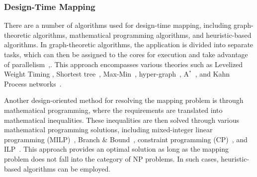 \subsubsection{Design-Time Mapping} There are a number of algorithms used for design-time mapping, including graph-theoretic algorithms, mathematical programming algorithms, and heuristic-based algorithms. In graph-theoretic algorithms, the application is divided into separate tasks, which can then be assigned to the cores for execution and take advantage of parallelism~\cite{gupta2021mapping},\cite{deveci2015hypergraph}. This approach encompasses various theories such as Levelized Weight Timing \cite{shivle2004static}, Shortest tree~\cite{bokhari1981shortest}, Max-Min~\cite{braun2001comparison}, hyper-graph~\cite{deveci2015hypergraph}, A$^{*}$~\cite{shivle2004static}, and Kahn Process networks~\cite{castrillon2012communication}.






Another design-oriented method for resolving the mapping problem is through mathematical programming, where the requirements are translated into mathematical inequalities. These inequalities are then solved through various mathematical programming solutions, including mixed-integer linear programming (MILP)~\cite{niemann1997algorithm}, Branch \& Bound~\cite{hu2005energy}, constraint programming (CP)~\cite{bhatti2012memory}, and ILP~\cite{kaida2012task}. This approach provides an optimal solution as long as the mapping problem does not fall into the category of NP problems. In such cases, heuristic-based algorithms can be employed.






